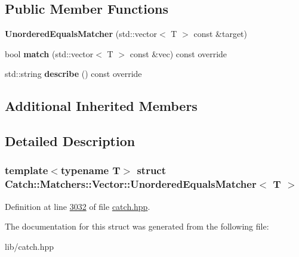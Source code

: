 \subsection*{Public Member Functions}
\begin{DoxyCompactItemize}
\item 
\mbox{\label{structCatch_1_1Matchers_1_1Vector_1_1UnorderedEqualsMatcher_a525905639b2b15b52ddb0bf14bfa19da}} 
{\bfseries Unordered\+Equals\+Matcher} (std\+::vector$<$ T $>$ const \&target)
\item 
\mbox{\label{structCatch_1_1Matchers_1_1Vector_1_1UnorderedEqualsMatcher_a3ccdd9dd2cd8bdbb8bb121acbb9cb358}} 
bool {\bfseries match} (std\+::vector$<$ T $>$ const \&vec) const override
\item 
\mbox{\label{structCatch_1_1Matchers_1_1Vector_1_1UnorderedEqualsMatcher_a7202d811200317abc58c844f663823df}} 
std\+::string {\bfseries describe} () const override
\end{DoxyCompactItemize}
\subsection*{Additional Inherited Members}


\subsection{Detailed Description}
\subsubsection*{template$<$typename T$>$\newline
struct Catch\+::\+Matchers\+::\+Vector\+::\+Unordered\+Equals\+Matcher$<$ T $>$}



Definition at line \mbox{\hyperlink{catch_8hpp_source_l03032}{3032}} of file \mbox{\hyperlink{catch_8hpp_source}{catch.\+hpp}}.



The documentation for this struct was generated from the following file\+:\begin{DoxyCompactItemize}
\item 
lib/catch.\+hpp\end{DoxyCompactItemize}
